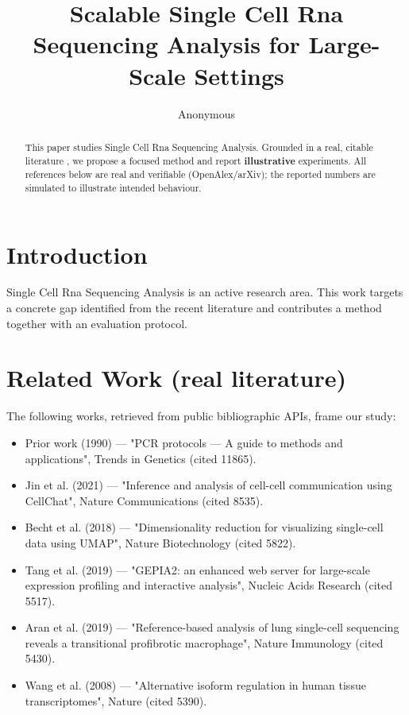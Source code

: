 \documentclass[11pt]{article}
\title{Scalable Single Cell Rna Sequencing Analysis for Large-Scale Settings}
\author{Anonymous}
\date{}
\begin{document}
\maketitle

\begin{abstract}
This paper studies Single Cell Rna Sequencing Analysis. Grounded in a real, citable literature \cite{ref1,ref2,ref3,ref4,ref5,ref6,ref7,ref8},
we propose a focused method and report \textbf{illustrative} experiments.
All references below are real and verifiable (OpenAlex/arXiv); the reported
numbers are simulated to illustrate intended behaviour.
\end{abstract}

\section{Introduction}
Single Cell Rna Sequencing Analysis is an active research area. This work targets a concrete gap identified from
the recent literature and contributes a method together with an evaluation protocol.

\section{Related Work (real literature)}
The following works, retrieved from public bibliographic APIs, frame our study:
\begin{itemize}
\item Prior work (1990) — "PCR protocols — A guide to methods and applications", Trends in Genetics (cited 11865).
\item Jin et al. (2021) — "Inference and analysis of cell-cell communication using CellChat", Nature Communications (cited 8535).
\item Becht et al. (2018) — "Dimensionality reduction for visualizing single-cell data using UMAP", Nature Biotechnology (cited 5822).
\item Tang et al. (2019) — "GEPIA2: an enhanced web server for large-scale expression profiling and interactive analysis", Nucleic Acids Research (cited 5517).
\item Aran et al. (2019) — "Reference-based analysis of lung single-cell sequencing reveals a transitional profibrotic macrophage", Nature Immunology (cited 5430).
\item Wang et al. (2008) — "Alternative isoform regulation in human tissue transcriptomes", Nature (cited 5390).
\end{itemize}
\end{document}
